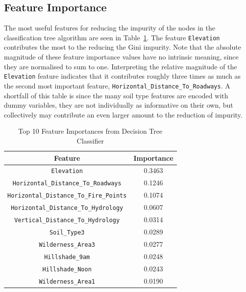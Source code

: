 \documentclass[10pt, conference]{IEEEtran}
\begin{document}
\subsection{Feature Importance}
The most useful features for reducing the impurity of the nodes in the classification tree algorithm are seen in Table~\ref{tab:feature_importance}. The feature \texttt{Elevation} contributes the most to the reducing the Gini impurity. Note that the absolute magnitude of these feature importance values have no intrinsic meaning, since they are normalised to sum to one. Interpreting the relative magnitude of the \texttt{Elevation} feature indicates that it contributes roughly three times as much as the second most important feature, \texttt{Horizontal\_Distance\_To\_Roadways}. A shortfall of this table is since the many soil type features are encoded with dummy variables, they are not individually as informative on their own, but collectively may contribute an even larger amount to the reduction of impurity. 

\begin{table}[!th]
	\caption{Top 10 Feature Importances from Decision Tree Classifier}
	\label{tab:feature_importance}
	\centering
	\begin{tabular}{|c|c|}
		\hline
		\textbf{Feature} & \textbf{Importance} \\
		\hline
		\texttt{Elevation} & 0.3463 \\
		\texttt{Horizontal\_Distance\_To\_Roadways} & 0.1246 \\
		\texttt{Horizontal\_Distance\_To\_Fire\_Points} & 0.1074 \\
		\texttt{Horizontal\_Distance\_To\_Hydrology} & 0.0607 \\
		\texttt{Vertical\_Distance\_To\_Hydrology} & 0.0314 \\
		\texttt{Soil\_Type3} & 0.0289 \\
		\texttt{Wilderness\_Area3} & 0.0277 \\
		\texttt{Hillshade\_9am} & 0.0248 \\
		\texttt{Hillshade\_Noon} & 0.0243 \\
		\texttt{Wilderness\_Area1} & 0.0190 \\
		\hline
	\end{tabular}
\end{table}
\end{document}
